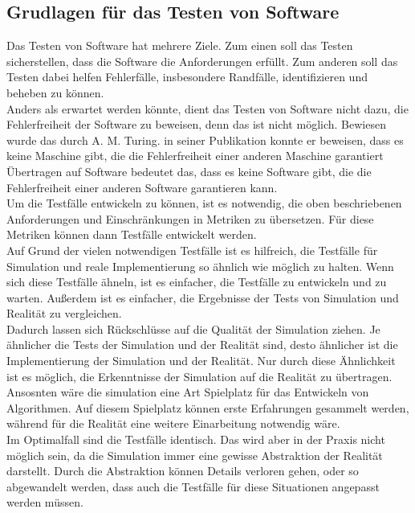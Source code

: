 \subsection{Grudlagen für das Testen von Software}
Das Testen von Software hat mehrere Ziele. Zum einen soll das Testen sicherstellen, dass die Software die Anforderungen erfüllt. 
Zum anderen soll das Testen dabei helfen Fehlerfälle, insbesondere Randfälle, identifizieren und beheben zu können. \\
Anders als erwartet werden könnte, dient das Testen von Software nicht dazu, die Fehlerfreiheit der Software zu beweisen, denn das ist nicht möglich. Bewiesen wurde das durch A. M. Turing. in seiner Publikation konnte er beweisen, dass es keine Maschine gibt, die die Fehlerfreiheit einer anderen Maschine garantiert \cite[S. 259ff]{maria1997introduction} \\
Übertragen auf Software bedeutet das, dass es keine Software gibt, die die Fehlerfreiheit einer anderen Software garantieren kann. \\
Um die Testfälle entwickeln zu können, ist es notwendig, die oben beschriebenen Anforderungen und Einschränkungen in Metriken zu übersetzen. Für diese Metriken können dann Testfälle entwickelt werden. \\
Auf Grund der vielen notwendigen Testfälle ist es hilfreich, die Testfälle für Simulation und reale Implementierung so ähnlich wie möglich zu halten. 
Wenn sich diese Testfälle ähneln, ist es einfacher, die Testfälle zu entwickeln und zu warten. Außerdem ist es einfacher, die Ergebnisse der Tests von Simulation und Realität zu vergleichen.\\
Dadurch lassen sich Rückschlüsse auf die Qualität der Simulation ziehen. Je ähnlicher die Tests der Simulation und der Realität sind, desto ähnlicher ist die Implementierung der Simulation und der Realität. 
Nur durch diese Ähnlichkeit ist es möglich, die Erkenntnisse der Simulation auf die Realität zu übertragen. Ansosnten wäre die simulation eine Art Spielplatz für das Entwickeln von Algorithmen. Auf diesem Spielplatz können erste Erfahrungen gesammelt werden, während für die Realität eine weitere Einarbeitung notwendig
wäre. \\
Im Optimalfall sind die Testfälle identisch. Das wird aber in der Praxis nicht möglich sein, da die Simulation immer eine gewisse Abstraktion der Realität darstellt. Durch die Abstraktion können Details verloren gehen, oder so abgewandelt werden, dass auch die Testfälle für diese Situationen angepasst werden müssen.


